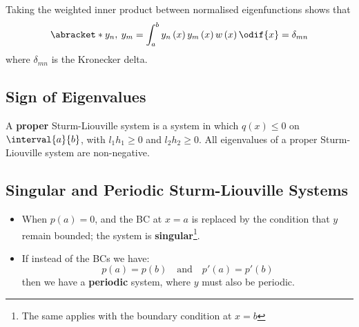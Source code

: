 \documentclass{article}
\begin{document}
Taking the weighted inner product between normalised eigenfunctions shows that
\begin{equation*}
    \abracket*{y_n,\: y_m} = \int_a^b y_n\left( x \right) y_m\left( x \right) w\left( x \right) \odif{x} = \delta_{mn}
\end{equation*}
where \(\delta_{mn}\) is the Kronecker delta.
\subsection{Sign of Eigenvalues}
A \textbf{proper} Sturm-Liouville system is a system in which \(q\left( x \right) \leqslant 0\) on \(\interval{a}{b}\),
with \(l_1h_1 \geqslant 0\) and \(l_2h_2 \geqslant 0\).
All eigenvalues of a proper Sturm-Liouville system are non-negative.
\subsection{Singular and Periodic Sturm-Liouville Systems}
\begin{itemize}
    \item When \(p\left( a \right) = 0\), and the BC at \(x = a\) is replaced by the condition that \(y\) remain bounded; the
          system is \textbf{singular}\footnote{The same applies with the boundary condition at \(x = b\)}.
    \item If instead of the BCs we have:
          \begin{equation*}
              p\left( a \right) = p\left( b \right) \quad \text{and} \quad p'\left( a \right) = p'\left( b \right)
          \end{equation*}
          then we have a \textbf{periodic} system, where \(y\) must also be periodic.
\end{itemize}
\end{document}
